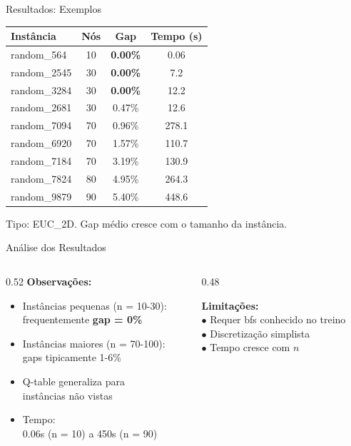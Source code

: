 \documentclass[11pt, xcolor=dvipsnames]{beamer}
\newcommand{\destaque}[1]{\textbf{\textcolor{verde}{#1}}}
\newcommand{\sutil}[1]{\textcolor{textoBase!60}{#1}}
\begin{document}
\begin{frame}{Resultados: Exemplos}
  \footnotesize
  \centering
  \renewcommand{\arraystretch}{1.15}
  \begin{tabular}{lccc}
    \toprule
    \textbf{Instância} & \textbf{Nós} & \textbf{Gap} & \textbf{Tempo (s)} \\
    \midrule
    random\_564 & 10 & \destaque{0.00\%} & 0.06 \\
    random\_2545 & 30 & \destaque{0.00\%} & 7.2 \\
    random\_3284 & 30 & \destaque{0.00\%} & 12.2 \\
    random\_2681 & 30 & 0.47\% & 12.6 \\
    random\_7094 & 70 & 0.96\% & 278.1 \\
    random\_6920 & 70 & 1.57\% & 110.7 \\
    random\_7184 & 70 & 3.19\% & 130.9 \\
    random\_7824 & 80 & 4.95\% & 264.3 \\
    random\_9879 & 90 & 5.40\% & 448.6 \\
    \bottomrule
  \end{tabular}
  \vspace{3mm}

  {\scriptsize \sutil{Tipo: EUC\_2D. Gap médio cresce com o tamanho da instância.}}
\end{frame}

\begin{frame}{Análise dos Resultados}
  \footnotesize
  \begin{columns}[T]
    \begin{column}{0.52\textwidth}
      \textbf{Observações:}
      \begin{itemize}
        \item Instâncias pequenas \sutil{(n = 10-30)}: \\ frequentemente \destaque{gap = 0\%}
        \item Instâncias maiores \sutil{(n = 70-100)}: \\ gaps tipicamente 1-6\%
        \item Q-table generaliza para \\ instâncias não vistas
        \item Tempo: \\ 0.06s \sutil{(n = 10)} a 450s \sutil{(n = 90)}
      \end{itemize}
    \end{column}
    \begin{column}{0.48\textwidth}
      \begin{alertbox}
        {\scriptsize
        \textbf{Limitações:} \\[1mm]
        $\bullet$ Requer bfs conhecido no treino \\
        $\bullet$ Discretização simplista \\
        $\bullet$ Tempo cresce com $n$
        }
      \end{alertbox}
    \end{column}
  \end{columns}
\end{frame}
\end{document}

